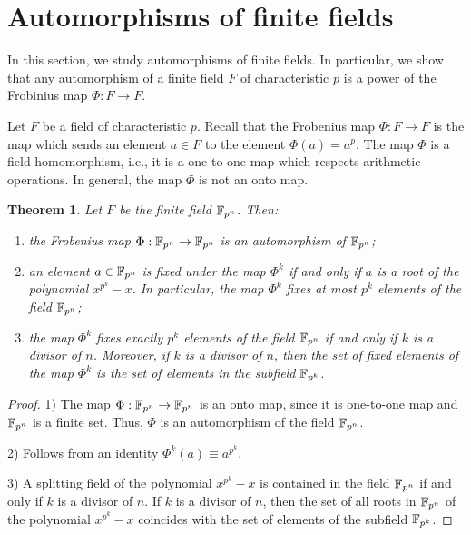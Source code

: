\documentclass[11pt]{article}
\theoremstyle{plain}
\newtheorem{theorem}{Theorem}[section]
\theoremstyle{definition}
\begin{document}
\section{Automorphisms of finite fields}\label{five}

In this section, we study automorphisms of finite fields. In particular, we show that any automorphism of a finite field $F$ of characteristic $p$ is a power of the Frobinius map $\Phi:F\to F$.

Let $F$ be a field of characteristic $p$. Recall that the Frobenius map  $\Phi:F\to F$ is the map which  sends an element $a\in F$ to the element $\Phi(a)=a^p$. The map $\Phi $ is a field homomorphism, i.e., it is a one-to-one map which respects arithmetic operations. In general, the map $\Phi$  is not an onto map.

\begin{theorem}\label{auto}  Let $F$ be the finite field $\Bbb F_{p^n}$.  Then:
\begin{enumerate}
\item the Frobenius map $\Phi:\Bbb F_{p^n}\to \Bbb F_{p^n}$ is an automorphism  of $\Bbb F_{p^n}$;
\item  an element $a\in  \Bbb F_{p^n}$ is fixed under   the map $\Phi^k$ if and only if $a$ is a root of the polynomial  $x^{p^k}-x$. In particular, the map $\Phi^k$ fixes at most $p^k$  elements of the field $\Bbb F_{p^n}$;

\item the map $\Phi^k$ fixes exactly  $p^k$ elements of the field $\Bbb F_{p^n}$ if and only if $k$ is a divisor of $n$. Moreover, if $k$ is a divisor of $n$, then the set of fixed elements  of the map $\Phi^k$ is the set of elements in the  subfield $\Bbb  F_{p^k}$.


\end{enumerate}
\end{theorem}

\begin{proof} 1) The map $\Phi:\Bbb F_{p^n}\to \Bbb F_{p^n}$ is an onto map, since it is one-to-one map and $\Bbb F_{p^n}$ is a finite set. Thus, $\Phi$ is an automorphism of the field $\Bbb F_{p^n}$.

2) Follows from an identity $\Phi^k(a)\equiv a^{p^k}$.

3)  A splitting field of the polynomial $x^{p^k}-x$ is contained in the field  $\Bbb F_{p^n}$ if and only if $k$ is a divisor of $n$. If $k$ is a divisor of $n$, then the set of all roots in $\Bbb F_{p^n}$ of the polynomial $x^{p^k}-x$ coincides with the set of elements of the subfield $\Bbb F_{p^k}$.
 \end{proof}
\end{document}
